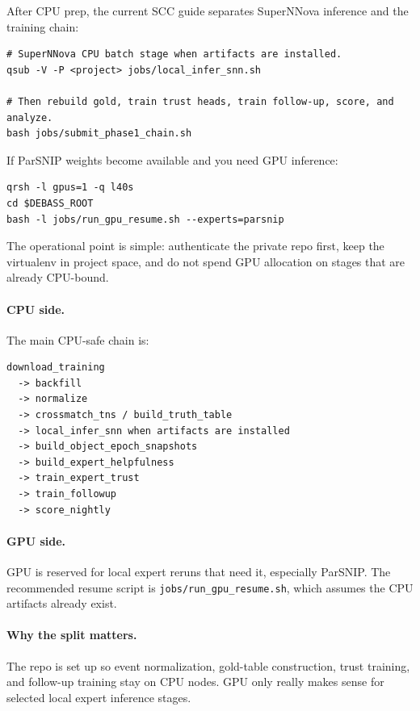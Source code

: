 \documentclass[11pt]{article}
\newcommand{\code}[1]{\texttt{#1}}
\begin{document}
After CPU prep, the current SCC guide separates SuperNNova inference and the training chain:

\begin{verbatim}
# SuperNNova CPU batch stage when artifacts are installed.
qsub -V -P <project> jobs/local_infer_snn.sh

# Then rebuild gold, train trust heads, train follow-up, score, and analyze.
bash jobs/submit_phase1_chain.sh
\end{verbatim}

If ParSNIP weights become available and you need GPU inference:

\begin{verbatim}
qrsh -l gpus=1 -q l40s
cd $DEBASS_ROOT
bash -l jobs/run_gpu_resume.sh --experts=parsnip
\end{verbatim}

The operational point is simple: authenticate the private repo first, keep the virtualenv in project space, and do not spend GPU allocation on stages that are already CPU-bound.

\paragraph{CPU side.}
The main CPU-safe chain is:

\begin{verbatim}
download_training
  -> backfill
  -> normalize
  -> crossmatch_tns / build_truth_table
  -> local_infer_snn when artifacts are installed
  -> build_object_epoch_snapshots
  -> build_expert_helpfulness
  -> train_expert_trust
  -> train_followup
  -> score_nightly
\end{verbatim}

\paragraph{GPU side.}
GPU is reserved for local expert reruns that need it, especially ParSNIP. The recommended resume script is \code{jobs/run\_gpu\_resume.sh}, which assumes the CPU artifacts already exist.

\paragraph{Why the split matters.}
The repo is set up so event normalization, gold-table construction, trust training, and follow-up training stay on CPU nodes. GPU only really makes sense for selected local expert inference stages.
\end{document}
